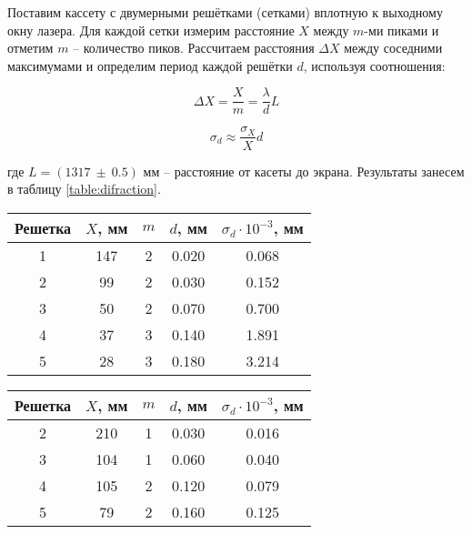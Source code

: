     Поставим кассету с двумерными решётками (сетками) вплотную к выходному окну лазера. Для каждой сетки измерим расстояние $X$ между $m$-ми пиками и отметим $m$ -- количество пиков. Рассчитаем расстояния $\Delta X$ между соседними максимумами и определим период каждой решётки $d$, используя соотношения:
    
    \begin{equation}
    \Delta X=\frac{X}{m}=\frac{\lambda}{d} L
    \end{equation}
    
    \[ \sigma_d \approx \frac{\sigma_X}{X} d \]
    
    где $L = (1317 ~ \pm ~ 0.5)$ мм -- расстояние от касеты до экрана. Результаты занесем в таблицу \ref{table:difraction}.
    
	\begin{minipage}{0.5\textwidth}
		\centering
		\begin{tabular}{|c|c|c|c|c|}
			\hline
			Решетка    & $X$, мм  & $m$ & $d$, мм & $\sigma_d \cdot 10^{-3}$, мм\\ \hline
			1          & 147      & 2   & 0.020    & 0.068\\ \hline
			2          & 99       & 2   & 0.030    & 0.152\\ \hline
			3          & 50       & 2   & 0.070    & 0.700\\ \hline
			4          & 37       & 3   & 0.140    & 1.891\\ \hline
			5          & 28       & 3   & 0.180    & 3.214\\ \hline
		\end{tabular}
		\label{table:difraction}
	\end{minipage}
	\begin{minipage}{0.55\textwidth}
		\centering
		\begin{tabular}{|c|c|c|c|c|}
			\hline
			Решетка    & $X$, мм   & $m$ & $d$, мм & $\sigma_d \cdot 10^{-3}$, мм\\ \hline
			2          & 210       & 1   & 0.030    & 0.016\\ \hline
			3          & 104       & 1   & 0.060    & 0.040\\ \hline
			4          & 105       & 2   & 0.120    & 0.079\\ \hline
			5          & 79        & 2   & 0.160    & 0.125\\ \hline
		\end{tabular}
		\label{table:lense_difractiton}
	\end{minipage}
    
